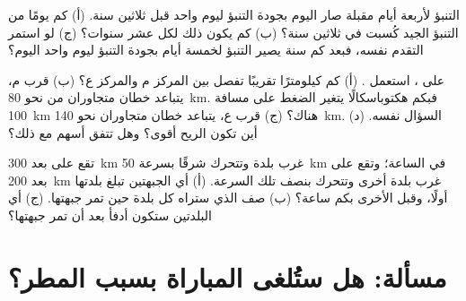 \begin{exercise}[$\star\star$]\label{exo:g8:fronts-and-weather-maps:10}
التنبؤ لأربعة أيام مقبلة صار اليوم بجودة التنبؤ ليوم واحد قبل ثلاثين
سنة. (أ) كم يومًا من التنبؤ الجيد كُسبت في ثلاثين سنة؟ (ب) كم يكون ذلك
لكل عشر سنوات؟ (ج) لو استمر التقدم نفسه، فبعد كم سنة يصير التنبؤ لخمسة أيام
بجودة التنبؤ ليوم واحد اليوم؟
\end{exercise}

\begin{exercise}[$\star\star\star$]\label{exo:g8:fronts-and-weather-maps:11}
على  ، استعمل . (أ) كم كيلومترًا تقريبًا تفصل بين
المركز م والمركز ع؟ (ب) قرب م، يتباعد خطان متجاوران من  نحو
\qty{80}{km}. فبكم هكتوباسكالًا يتغير الضغط على مسافة \qty{100}{km} هناك؟ (ج) قرب ع، يتباعد خطان
متجاوران نحو \qty{140}{km}. السؤال نفسه. (د) أين تكون
الريح أقوى؟ وهل تتفق أسهم  مع ذلك؟
\end{exercise}

\begin{exercise}[$\star\star\star$]\label{exo:g8:fronts-and-weather-maps:12}
تقع  على بعد \qty{300}{km} غرب بلدة وتتحرك شرقًا بسرعة
\qty{50}{km} في الساعة؛ وتقع  على بعد \qty{200}{km} غرب بلدة
أخرى وتتحرك بنصف تلك السرعة. (أ) أي الجبهتين تبلغ بلدتها
أولًا، وقبل الأخرى بكم ساعة؟ (ب) صف  الذي ستراه كل بلدة
حين تمر جبهتها. (ج) أي البلدتين ستكون أدفأ بعد أن تمر
جبهتها؟
\end{exercise}

\section{مسألة: هل ستُلغى المباراة بسبب المطر؟}

